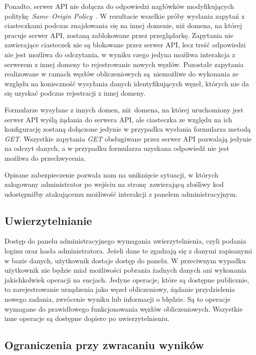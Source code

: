 \documentclass[a4paper,11pt,twoside]{report}
\theoremstyle{definition}
\begin{document}
Ponadto, serwer API nie dołącza do odpowiedzi nagłówków modyfikujących politykę \textit{Same--Origin Policy}~\cite{same-origin-policy}. W rezultacie wszelkie próby wysłania zapytań z ciasteczkami podczas znajdowania się na innej domenie, niż domena, na której pracuje serwer API, zostaną zablokowane przez przeglądarkę. 
Zapytania nie zawierające ciasteczek nie są blokowane przez serwer API, lecz treść odpowiedzi nie jest możliwa do odczytania, w wyniku czego jedyna możliwa interakcja z serwerem z innej domeny to rejestrowanie nowych węzłów.
Pozostałe zapytania realizowane w ramach węzłów obliczeniowych są niemożliwe do wykonania ze względu na konieczność wysyłania danych identyfikujących węzeł, których nie da się uzyskać podczas rejestracji z innej domeny.


Formularze wysyłane z innych domen, niż domena, na której uruchomiony jest serwer API wyślą żądania do serwera API, ale ciasteczka ze względu na ich konfigurację zostaną dołączone jedynie w przypadku wysłania formularza metodą \textit{GET}.
Wszystkie zapytania \textit{GET} obsługiwane przez serwer API pozwalają jedynie na odczyt danych, a w przypadku formularza uzyskana odpowiedź nie jest możliwa do przechwycenia.

Opisane zabezpieczenie pozwala nam na uniknięcie sytuacji, w których zalogowany administrator po wejściu na stronę zawierającą złośliwy kod udostępniłby atakującemu możliwość interakcji z panelem administracyjnym.

\subsection{Uwierzytelnianie} 

Dostęp do panelu administracyjnego wymagania uwierzytelnienia, czyli podania loginu oraz hasła administratora.
Jeżeli dane te zgadzają się z danymi zapisanymi w bazie danych, użytkownik dostaje dostęp do panelu.
W przeciwnym wypadku użytkownik nie będzie miał możliwości pobrania żadnych danych ani wykonania jakichkolwiek operacji na encjach.
Jedyne operacje, które są dostępne publicznie, to zarejestrowanie urządzenia jako węzeł obliczeniowy, żądanie przydzielenia nowego zadania, zwrócenie wyniku lub informacji o błędzie.
Są to operacje wymagane do prawidłowego funkcjonowania węzłów obliczeniowych. Wszystkie inne operacje są dostępne dopiero po uwierzytelnieniu.

\subsection{Ograniczenia przy zwracaniu wyników}
\end{document}
